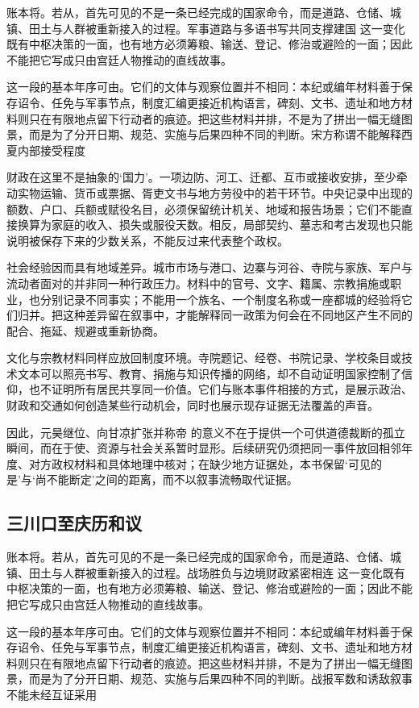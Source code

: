 账本将。若从，首先可见的不是一条已经完成的国家命令，而是道路、仓储、城镇、田土与人群被重新接入的过程。军事道路与多语书写共同支撑建国 这一变化既有中枢决策的一面，也有地方必须筹粮、输送、登记、修治或避险的一面；因此不能把它写成只由宫廷人物推动的直线故事。

这一段的基本年序可由。它们的文体与观察位置并不相同：本纪或编年材料善于保存诏令、任免与军事节点，制度汇编更接近机构语言，碑刻、文书、遗址和地方材料则只在有限地点留下行动者的痕迹。把这些材料并排，不是为了拼出一幅无缝图景，而是为了分开日期、规范、实施与后果四种不同的判断。宋方称谓不能解释西夏内部接受程度

财政在这里不是抽象的‘国力’。一项边防、河工、迁都、互市或接收安排，至少牵动实物运输、货币或票据、胥吏文书与地方劳役中的若干环节。中央记录中出现的额数、户口、兵额或赋役名目，必须保留统计机关、地域和报告场景；它们不能直接换算为家庭的收入、损失或服役天数。相反，局部契约、墓志和考古发现也只能说明被保存下来的少数关系，不能反过来代表整个政权。

社会经验因而具有地域差异。城市市场与港口、边寨与河谷、寺院与家族、军户与流动者面对的并非同一种行政压力。材料中的官号、文字、籍属、宗教捐施或职业，也分别记录不同事实；不能用一个族名、一个制度名称或一座都城的经验将它们归并。把这种差异留在叙事中，才能解释同一政策为何会在不同地区产生不同的配合、拖延、规避或重新协商。

文化与宗教材料同样应放回制度环境。寺院题记、经卷、书院记录、学校条目或技术文本可以照亮书写、教育、捐施与知识传播的网络，却不自动证明国家控制了信仰，也不证明所有居民共享同一价值。它们与账本事件相接的方式，是展示政治、财政和交通如何创造某些行动机会，同时也展示现存证据无法覆盖的声音。

因此，元昊继位、向甘凉扩张并称帝 的意义不在于提供一个可供道德裁断的孤立瞬间，而在于使、资源与社会关系暂时显形。后续研究仍须把同一事件放回相邻年度、对方政权材料和具体地理中核对；在缺少地方证据处，本书保留‘可见的是’与‘尚不能断定’之间的距离，而不以叙事流畅取代证据。

\subsection{三川口至庆历和议}

账本将。若从，首先可见的不是一条已经完成的国家命令，而是道路、仓储、城镇、田土与人群被重新接入的过程。战场胜负与边境财政紧密相连 这一变化既有中枢决策的一面，也有地方必须筹粮、输送、登记、修治或避险的一面；因此不能把它写成只由宫廷人物推动的直线故事。

这一段的基本年序可由。它们的文体与观察位置并不相同：本纪或编年材料善于保存诏令、任免与军事节点，制度汇编更接近机构语言，碑刻、文书、遗址和地方材料则只在有限地点留下行动者的痕迹。把这些材料并排，不是为了拼出一幅无缝图景，而是为了分开日期、规范、实施与后果四种不同的判断。战报军数和诱敌叙事不能未经互证采用

